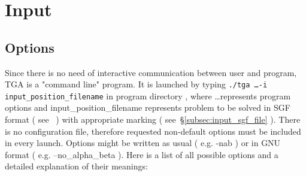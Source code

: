 \section{Input}

\subsection{Options}

Since there is no need of interactive communication between user and program, TGA is a "command line" program. It is launched by typing {\tt ./tga
\dots -i input\_position\_filename} in program directory , where \dots represents program options and input\_position\_filename represents problem to
be solved in SGF format ( see~\cite{web:sgf} ) with appropriate marking ( see~\S\ref{subsec:input_sgf_file} ). There is no configuration file, therefore
requested non-default options must be included in every launch. Options might be written as usual ( e.g. -nab ) or in GNU format ( e.g. --no\_alpha\_beta
). Here is a list of all possible options and a detailed explanation of their meanings:
